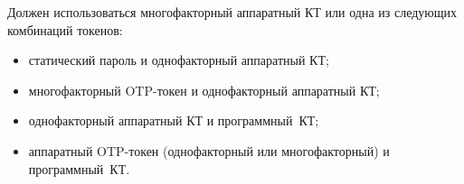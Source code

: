 Должен использоваться многофакторный аппаратный КТ или одна из следующих 
комбинаций токенов: 
\begin{itemize}
\item
статический пароль и однофакторный аппаратный КТ;
\item
многофакторный OTP-токен и однофакторный аппаратный КТ;
\item
однофакторный аппаратный КТ и программный~КТ;
\item
аппаратный OTP-токен (однофакторный или многофакторный) и программный~КТ.
\end{itemize}


